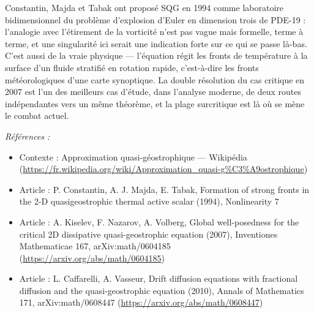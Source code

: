 \documentclass[11pt]{article}
\newenvironment{refs}{\par\small\noindent\emph{Références :}\begin{itemize}\setlength\itemsep{0pt}}{\end{itemize}\normalsize}
\begin{document}
\noindent Constantin, Majda et Tabak ont proposé SQG en 1994 comme
laboratoire bidimensionnel du problème d'explosion d'Euler en dimension trois de
PDE-19 : l'analogie avec l'étirement de la vorticité n'est pas vague mais formelle, terme à terme,
et une singularité ici serait une indication forte sur ce qui se passe là-bas. C'est aussi de la
vraie physique --- l'équation régit les fronts de température à la surface d'un fluide stratifié en
rotation rapide, c'est-à-dire les fronts météorologiques d'une carte synoptique.
La double résolution du cas critique en 2007 est l'un des meilleurs cas d'étude, dans l'analyse
moderne, de deux routes indépendantes vers un même théorème, et la plage surcritique est là où se
mène le combat actuel.

\begin{refs}
\item Contexte : Approximation quasi-géostrophique --- Wikipédia (\url{https://fr.wikipedia.org/wiki/Approximation_quasi-g%C3%A9ostrophique})
\item Article : P. Constantin, A. J. Majda, E. Tabak, \og{} Formation of strong fronts in the 2-D quasigeostrophic thermal active scalar \fg{} (1994), Nonlinearity 7
\item Article : A. Kiselev, F. Nazarov, A. Volberg, \og{} Global well-posedness for the critical 2D dissipative quasi-geostrophic equation \fg{} (2007), Inventiones Mathematicae 167, arXiv:math/0604185 (\url{https://arxiv.org/abs/math/0604185})
\item Article : L. Caffarelli, A. Vasseur, \og{} Drift diffusion equations with fractional diffusion and the quasi-geostrophic equation \fg{} (2010), Annals of Mathematics 171, arXiv:math/0608447 (\url{https://arxiv.org/abs/math/0608447})
\end{refs}

\bigskip
\end{document}
